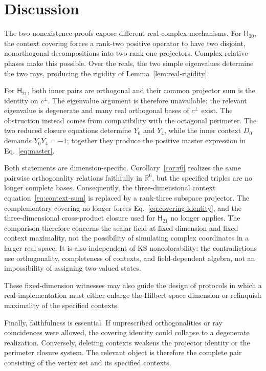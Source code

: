 \documentclass[twocolumn,aps,pra,floatfix,amsmath,amssymb,longbibliography]{revtex4-2}
\theoremstyle{definition}
\theoremstyle{remark}
\newcommand{\R}{\mathbb R}
\newcommand{\Htwenty}{\mathsf H_{20}}
\newcommand{\Htwentyone}{\mathsf H_{21}}
\begin{document}
\section{Discussion}

The two nonexistence proofs expose different real-complex mechanisms.
For $\Htwenty$, the context covering forces a rank-two positive operator
to have two disjoint, nonorthogonal decompositions into two rank-one
projectors.  Complex relative phases make this possible.  Over the
reals, the two simple eigenvalues determine the two rays, producing the
rigidity of Lemma~\ref{lem:real-rigidity}.

For $\Htwentyone$, both inner pairs are orthogonal and their common
projector sum is the identity on $c^\perp$.  The eigenvalue argument is
therefore unavailable: the relevant eigenvalue is degenerate and many
real orthogonal bases of $c^\perp$ exist.  The obstruction instead comes
from compatibility with the octagonal perimeter.  The two reduced
closure equations determine $Y_0$ and $Y_4$, while the inner context
$D_0$ demands $Y_0Y_4=-1$; together they produce the positive master
expression in Eq.~\eqref{eq:master}.

Both statements are dimension-specific.  Corollary~\ref{cor:r6} realizes the
same pairwise orthogonality relations faithfully in $\R^6$, but the specified
triples are no longer complete bases.  Consequently, the three-dimensional
context equation~\eqref{eq:context-sum} is replaced by a rank-three subspace
projector.  The complementary covering no longer forces
Eq.~\eqref{eq:covering-identity}, and the three-dimensional cross-product
closure used for $\Htwentyone$ no longer applies.  The comparison therefore
concerns the scalar field at fixed dimension and fixed context maximality,
not the possibility of simulating complex coordinates in a larger real
space.  It is also independent of KS noncolorability: the contradictions use
orthogonality, completeness of contexts, and field-dependent algebra, not an
impossibility of assigning two-valued states.

These fixed-dimension witnesses may also guide the design of protocols in
which a real implementation must either enlarge the Hilbert-space dimension
or relinquish maximality of the specified contexts.

Finally, faithfulness is essential.  If unprescribed orthogonalities or
ray coincidences were allowed, the covering identity could collapse to
a degenerate realization.  Conversely, deleting contexts weakens the
projector identity or the perimeter closure system.  The relevant
object is therefore the complete pair consisting of the vertex set and
its specified contexts.
\end{document}
